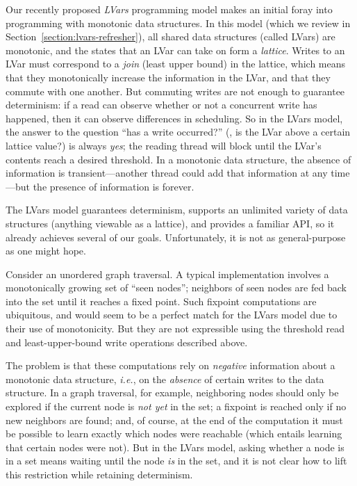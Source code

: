 Our recently proposed {\em LVars} programming model \cite{LVars-paper} makes an
initial foray into programming with monotonic data
structures.  
In this model (which we review in
Section~\ref{section:lvars-refresher}), all shared data structures (called
LVars) are monotonic, and 
the states that an LVar can take on form a \emph{lattice}.
Writes to an LVar must correspond to a \emph{join}
(least upper bound) in the lattice, which means that they monotonically increase
the information in the LVar, and that they commute with one another.  But
commuting writes are not enough to guarantee determinism: if a read can observe
whether or not a concurrent write has happened, then it can observe differences
in scheduling.  So in the LVars model, the answer to the question ``has a write
occurred?'' (\ie, is the LVar above a certain lattice value?) is always
\emph{yes}; the reading thread will block until the LVar's contents reach a desired
threshold.  In a monotonic data structure, the absence of information is
transient---another thread could add that information at any time---but the
presence of information is forever.

The LVars model guarantees determinism, supports an unlimited variety of data
structures (anything viewable as a lattice), and provides a familiar
API, so it already achieves several of our goals.
Unfortunately, it is not as general-purpose as one might hope.

Consider an unordered graph traversal.
A typical implementation involves a
monotonically growing set of ``seen nodes''; neighbors of seen nodes are fed
back into the set until it reaches a fixed point.  Such fixpoint computations
are ubiquitous, and would seem to be a perfect match for the LVars model due to
their use of monotonicity.
But they are not expressible using the threshold read
and least-upper-bound write operations described above.


The problem is that these computations rely on \emph{negative} information about
a monotonic data structure, \emph{i.e.}, on the \emph{absence} of certain writes
to the data structure.  In a graph traversal, for example, neighboring nodes
should only be explored if the current node is \emph{not yet} in the set; a
fixpoint is reached only if no new neighbors are found; and, of course, at the
end of the computation it must be possible to learn exactly which nodes were
reachable (which entails learning that certain nodes were not).  But in the
LVars model, asking whether a node is in a set means waiting until the node
\emph{is} in the set, and it is not clear how to lift this restriction while
retaining determinism.

